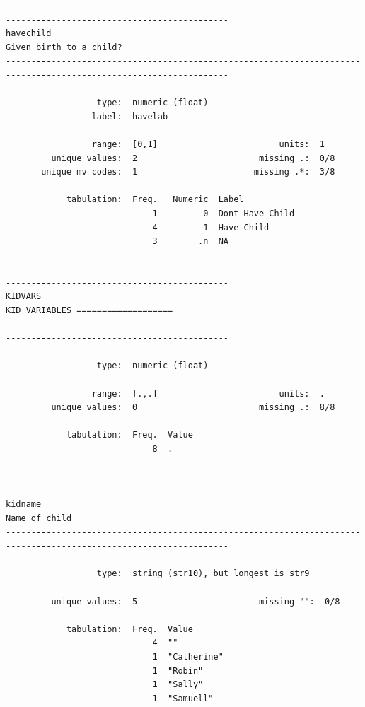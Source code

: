 \documentclass[
]{book}
\begin{document}
\begin{verbatim}
------------------------------------------------------------------------------------------------------------------
havechild                                                                                  Given birth to a child?
------------------------------------------------------------------------------------------------------------------

                  type:  numeric (float)
                 label:  havelab

                 range:  [0,1]                        units:  1
         unique values:  2                        missing .:  0/8
       unique mv codes:  1                       missing .*:  3/8

            tabulation:  Freq.   Numeric  Label
                             1         0  Dont Have Child
                             4         1  Have Child
                             3        .n  NA

------------------------------------------------------------------------------------------------------------------
KIDVARS                                                                          KID VARIABLES ===================
------------------------------------------------------------------------------------------------------------------

                  type:  numeric (float)

                 range:  [.,.]                        units:  .
         unique values:  0                        missing .:  8/8

            tabulation:  Freq.  Value
                             8  .

------------------------------------------------------------------------------------------------------------------
kidname                                                                                              Name of child
------------------------------------------------------------------------------------------------------------------

                  type:  string (str10), but longest is str9

         unique values:  5                        missing "":  0/8

            tabulation:  Freq.  Value
                             4  ""
                             1  "Catherine"
                             1  "Robin"
                             1  "Sally"
                             1  "Samuell"


\end{verbatim}
\end{document}
